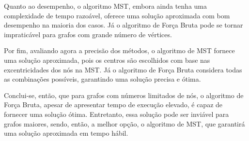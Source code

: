 Quanto ao desempenho, o algoritmo MST, embora ainda tenha uma complexidade de tempo razoável, oferece uma solução aproximada com bom desempenho na maioria dos casos. Já o algoritmo de Força Bruta pode se tornar impraticável para grafos com grande número de vértices.

Por fim, avaliando agora a precisão dos métodos, o algoritmo de MST fornece uma solução aproximada, pois os centros são escolhidos com base nas excentricidades dos nós na MST. Já o algoritmo de Força Bruta considera todas as combinações possíveis, garantindo uma solução precisa e ótima. 

Conclui-se, então, que para grafos com números limitados de nós, o algoritmo de Força Bruta, apesar de apresentar tempo de execução elevado, é capaz de fornecer uma solução ótima. Entretanto, essa solução pode ser inviável para grafos maiores, sendo, então, a melhor opção, o algoritmo de MST, que garantirá uma solução aproximada em tempo hábil. 





